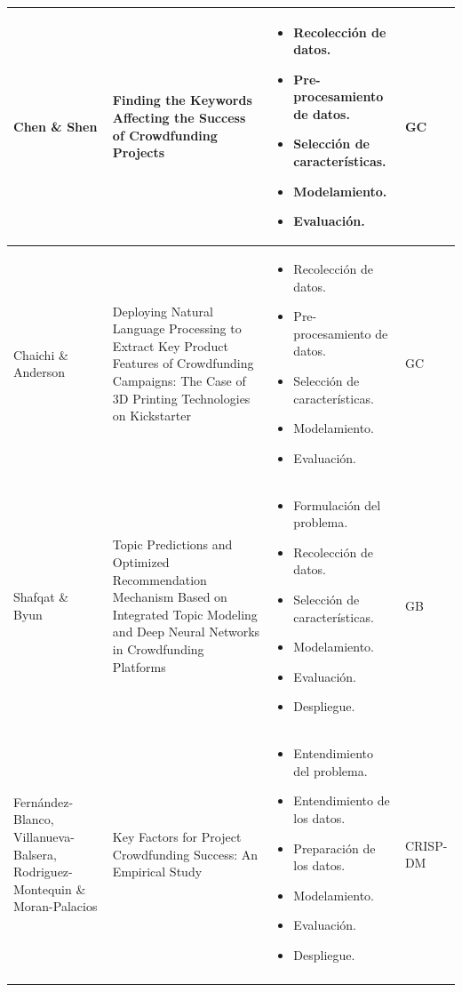 \begin{longtable}{M{3cm}M{5.5cm}M{5.5cm}M{1.5cm}}
			\hline
			Chen \& Shen
			& Finding the Keywords Affecting the Success of Crowdfunding Projects
			& 
			\begin{itemize}[label={--},nosep,noitemsep,leftmargin=*,topsep=0pt,partopsep=0pt]
				\item Recolección de datos.
				\item Pre-procesamiento de datos.
				\item Selección de características.
				\item Modelamiento.
				\item Evaluación.
			\end{itemize}
			& GC
			\\
			\hline
			Chaichi \& Anderson
			& Deploying Natural Language Processing to Extract Key Product Features of Crowdfunding Campaigns: The Case of 3D Printing Technologies on Kickstarter
			& 
			\begin{itemize}[label={--},nosep,noitemsep,leftmargin=*,topsep=0pt,partopsep=0pt]
				\item Recolección de datos.
				\item Pre-procesamiento de datos.
				\item Selección de características.
				\item Modelamiento.
				\item Evaluación.
			\end{itemize}
			& GC
			\\
			\hline
			Shafqat \& Byun
			& Topic Predictions and Optimized Recommendation Mechanism Based on Integrated Topic Modeling and Deep Neural Networks in Crowdfunding Platforms
			& 
			\begin{itemize}[label={--},nosep,noitemsep,leftmargin=*,topsep=0pt,partopsep=0pt]
				\item Formulación del problema.
				\item Recolección de datos.
				\item Selección de características.
				\item Modelamiento.
				\item Evaluación.
				\item Despliegue.
			\end{itemize}
			& GB
			\\
			\hline
			Fernández-Blanco, Villanueva-Balsera, Rodriguez-Montequin \& Moran-Palacios
			& Key Factors for Project Crowdfunding Success: An Empirical Study
			& 
			\begin{itemize}[label={--},nosep,noitemsep,leftmargin=*,topsep=0pt,partopsep=0pt]
				\item Entendimiento del problema.
				\item Entendimiento de los datos.
				\item Preparación de los datos.
				\item Modelamiento.
				\item Evaluación.
				\item Despliegue.
			\end{itemize}
			& CRISP-DM
			\\
			\specialrule{.1em}{.05em}{.05em}
		\end{longtable}%
